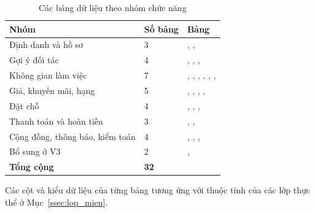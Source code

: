 
\begin{table}[!htbp]
\centering
\caption{Các bảng dữ liệu theo nhóm chức năng}
\label{tab:bang_theo_module}
\small
\renewcommand{\arraystretch}{1.2}
\begin{tabularx}{\linewidth}{|P{3.6cm}|P{1.0cm}|L|}
\hline
\textbf{Nhóm} & \textbf{Số bảng} & \textbf{Bảng} \\
\hline
Định danh và hồ sơ & 3 & , ,  \\
\hline
Gợi ý đối tác & 4 & , , ,  \\
\hline
Không gian làm việc & 7 & , , , , , ,  \\
\hline
Giá, khuyến mãi, hạng & 5 & , , , ,  \\
\hline
Đặt chỗ & 4 & , , ,  \\
\hline
Thanh toán và hoàn tiền & 3 & , ,  \\
\hline
Cộng đồng, thông báo, kiểm toán & 4 & , , ,  \\
\hline
Bổ sung ở V3 & 2 & ,  \\
\hline
\textbf{Tổng cộng} & \textbf{32} & \\
\hline
\end{tabularx}
\end{table}

Các cột và kiểu dữ liệu của từng bảng tương ứng với thuộc tính của các lớp thực thể ở Mục~\ref{ssec:lop_mien}.

